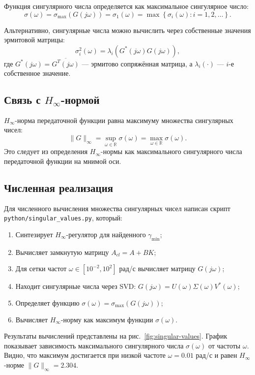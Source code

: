 Функция сингулярного числа определяется как максимальное сингулярное число:
\[
\sigma(\omega) = \sigma_{\max}(G(j\omega)) = \sigma_1(\omega) = \max \left\{ \sigma_i(\omega) : i = 1, 2, \ldots \right\}.
\]

Альтернативно, сингулярные числа можно вычислить через собственные значения эрмитовой матрицы:
\[
\sigma_i^2(\omega) = \lambda_i\left( G^*(j\omega) G(j\omega) \right),
\]
где $G^*(j\omega) = \overline{G^T(j\omega)}$ — эрмитово сопряжённая матрица, а $\lambda_i(\cdot)$ — $i$-е собственное значение.

\subsection{Связь с $H_{\infty}$-нормой}

$H_{\infty}$-норма передаточной функции равна максимуму множества сингулярных чисел:
\[
\|G\|_{\infty} = \sup_{\omega \in \mathbb{R}} \sigma(\omega) = \max_{\omega \in \mathbb{R}} \sigma(\omega).
\]
Это следует из определения $H_{\infty}$-нормы как максимального сингулярного числа передаточной функции на мнимой оси.

\subsection{Численная реализация}

Для численного вычисления множества сингулярных чисел написан скрипт \texttt{python/singular\_values.py}, который:
\begin{enumerate}
\item Синтезирует $H_{\infty}$-регулятор для найденного $\gamma_{\min}$;
\item Вычисляет замкнутую матрицу $A_{cl} = A + BK$;
\item Для сетки частот $\omega \in [10^{-2}, 10^{2}]$ рад/с вычисляет матрицу $G(j\omega)$;
\item Находит сингулярные числа через SVD: $G(j\omega) = U(\omega) \Sigma(\omega) V^*(\omega)$;
\item Определяет функцию $\sigma(\omega) = \sigma_{\max}(G(j\omega))$;
\item Вычисляет $H_{\infty}$-норму как максимум функции $\sigma(\omega)$.
\end{enumerate}

Результаты вычислений представлены на рис.~\ref{fig:singular-values}. График показывает зависимость максимального сингулярного числа $\sigma(\omega)$ от частоты $\omega$. Видно, что максимум достигается при низкой частоте $\omega = 0.01$ рад/с и равен $H_{\infty}$-норме $\|G\|_{\infty} = 2.304$.

